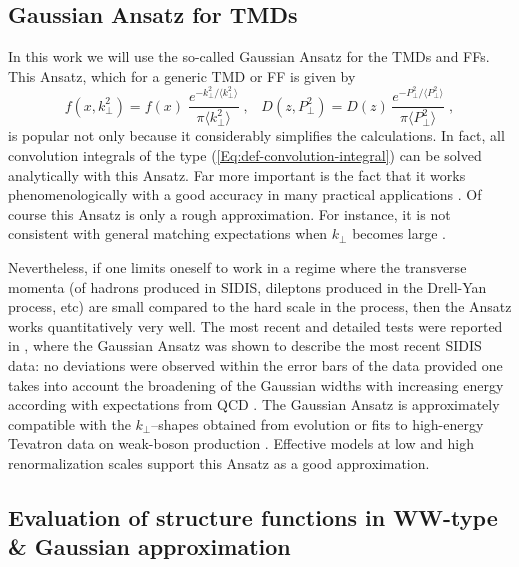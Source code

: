 \documentclass[a4paper,11pt]{article}
\newcommand{\blue}[1]{{\color{blue} #1}}
\newcommand{\be}{\begin{equation}}
\newcommand{\ee}{\end{equation}}
\newcommand{\la}{\langle}
\newcommand{\ra}{\rangle}
\newcommand{\ps}[1]{\blue{ #1}}
\def\kperp{k_\perp}
\def\pperp{P_\perp}
\def\avkperp{\la \kperp^2 \ra}
\def\avpperp{\la \pperp^2 \ra}
\begin{document}
\ps{

\subsection{Gaussian Ansatz for TMDs}
\label{Sec-4.3:evaluation}

In this work we will use the so-called Gaussian Ansatz for the TMDs and FFs.
This Ansatz, which for a generic TMD or FF is given by
\be\label{Eq:Gauss-generic}
    f(x,\kperp^2) = f(x)\;
    \frac{e^{-\kperp^2/\avkperp}}{\pi\avkperp} \;,\;\;\;
    D(z,\pperp^2) = D(z)\,
    \frac{e^{-\pperp^2/\avpperp}}{\pi\avpperp}\;,
\ee
is popular not only because it considerably simplifies the
calculations. In fact, all convolution integrals of the type 
(\ref{Eq:def-convolution-integral}) can be solved analytically 
with this Ansatz. Far more important is the fact that it works 
phenomenologically with a good accuracy in many practical applications
\cite{Anselmino:2005nn,Collins:2005ie,D'Alesio:2007jt,Schweitzer:2010tt,
Signori:2013mda,Anselmino:2013lza}.
Of course this Ansatz is only a rough approximation. For instance, 
it is not consistent with general matching expectations when $\kperp$ 
becomes large \cite{Bacchetta:2008xw}. 

Nevertheless, if one limits oneself to work in a regime where the 
transverse momenta (of hadrons produced in SIDIS, dileptons produced
in the Drell-Yan process, etc) are small compared to the hard
scale in the process, then the Ansatz works quantitatively
very well. The most recent and detailed tests were reported in 
\cite{Schweitzer:2010tt}, where the Gaussian Ansatz was shown to
describe the most recent SIDIS data: no deviations were observed 
within the error bars of the data provided one takes into account 
the broadening of the Gaussian widths with increasing energy 
\cite{Schweitzer:2010tt} according
with expectations from QCD \cite{Aybat:2011zv}.
The Gaussian Ansatz is approximately compatible with 
the $\kperp$--shapes obtained from evolution \cite{Aybat:2011zv}
or fits to high-energy Tevatron data on weak-boson production
\cite{Landry:2002ix}. Effective models at 
low \cite{Pasquini:2008ax,Avakian:2010br,Lorce:2011dv} and 
high \cite{Efremov:2009ze} renormalization scales support this
Ansatz as a good approximation.

\subsection{Evaluation of structure functions in WW-type \&
 Gaussian approximation}
\label{Sec-4.4:evaluation}

}
\end{document}
